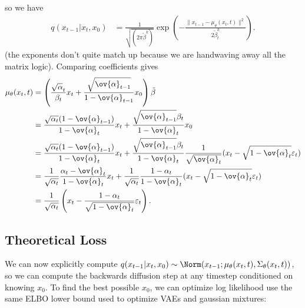 so we have
\begin{align*}
q(x_{t-1}|x_t,x_0) &= \frac{1}{\sqrt{(2\pi\tilde{\beta}^k)}}\exp\left(-\frac{\lVert x_{t-1} - \mu_{\theta}(x_t,t)\rVert^2}{2\tilde{\beta}_t^k}\right). 
\end{align*}
(the exponents don't quite match up because we are handwaving away all the matrix logic). Comparing coefficients gives 
\begin{align*}
	\mu_{\theta}(x_t,t) &= \left(\frac{\sqrt{\alpha}_t}{\beta_t}x_t + \frac{\sqrt{\ov{\alpha}_{t-1}}}{1-\ov{\alpha}_{t-1}}x_0\right)\tilde{\beta} \\
											&= \frac{\sqrt{\alpha_t}(1-\ov{\alpha}_{t-1})}{1-\ov{\alpha}_t}x_t + \frac{\sqrt{\ov{\alpha}_{t-1}}\beta_t}{1-\ov{\alpha}_t}x_0 \\
											&= \frac{\sqrt{\alpha_t}(1-\ov{\alpha}_{t-1})}{1-\ov{\alpha}_t}x_t + \frac{\sqrt{\ov{\alpha}_{t-1}}\beta_t}{1-\ov{\alpha}_t}\frac{1}{\sqrt{\ov{\alpha}_t}}(x_t - \sqrt{1-\ov{\alpha}_t}\varepsilon_t) \\
											&= \frac{1}{\sqrt{\alpha_t}}\frac{\alpha_t-\ov{\alpha}_t}{1-\ov{\alpha}_t}x_t + \frac{1}{\sqrt{\alpha_t}}\frac{1-\alpha_t}{1-\ov{\alpha}_t}(x_t - \sqrt{1-\ov{\alpha}_t}\varepsilon_t) \\
											&= \frac{1}{\sqrt{\alpha_t}}\left(x_t - \frac{1-\alpha_t}{\sqrt{1-\ov{\alpha}_t}}\varepsilon_t\right). 
\end{align*}

\subsection{Theoretical Loss}

We can now explicitly compute $q(x_{t-1}|x_t,x_0)\sim \Norm(x_{t-1};\mu_{\theta}(x_t,t), \Sigma_{\theta}(x_t,t))$, so we can compute the backwards diffusion step at any timestep conditioned on knowing $x_0$. To find the best possible $x_0$, we can optimize log likelihood use the same ELBO lower bound used to optimize VAEs and gaussian mixtures: 


